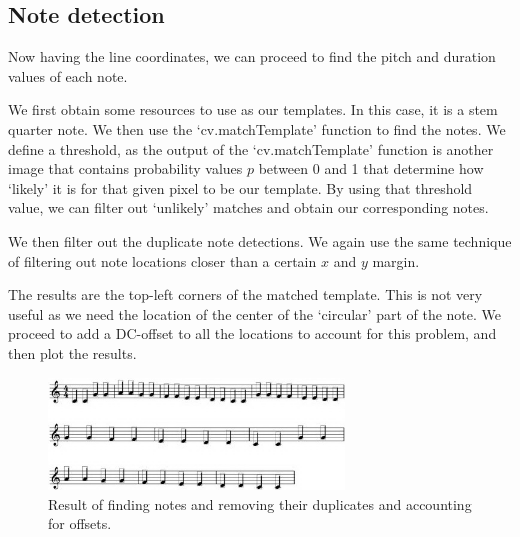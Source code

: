 \documentclass[12pt]{article}
\begin{document}
\subsection{Note detection}
Now having the line coordinates, we can proceed to find the pitch and duration values of each note.

We first obtain some resources to use as our templates. In this case, it is a stem quarter note.
We then use the `cv.matchTemplate' function to find the notes. We define a threshold, as the output of the
`cv.matchTemplate' function is another image that contains probability values $p$ between 0 and 1 that
determine how `likely' it is for that given pixel to be our template. By using that threshold value,
we can filter out `unlikely' matches and obtain our corresponding notes.

We then filter out the duplicate note detections. We again use the same technique of filtering out note locations
closer than a certain $x$ and $y$ margin.

The results are the top-left corners of the matched template. This is not very useful as we need the location of the center
of the `circular' part of the note. We proceed to add a DC-offset to all the locations to account for this problem, and then
plot the results.

\begin{figure}[h!]
    \centering
    \includegraphics[width=0.7\textwidth]{detected twinkle.JPG}
    \caption{Result of finding notes and removing their duplicates and accounting for offsets.}
    \label{fig:3}
\end{figure}

\pagebreak
\end{document}
